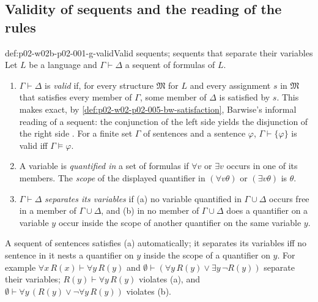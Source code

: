 \subsection{Validity of sequents and the reading of the rules}
\label{sec:p02-w02b-p02-001-g-setup}

\begin{hbdefinition}{def:p02-w02b-p02-001-g-valid}{Valid sequents; sequents that separate their variables}
Let \(L\) be a language and \(\Gamma\vdash\Delta\) a sequent of formulas of
\(L\).
\begin{enumerate}
\item \(\Gamma\vdash\Delta\) is \emph{valid} if, for every structure
      \(\mathfrak M\) for \(L\) and every assignment \(s\) in \(\mathfrak M\)
      that satisfies every member of \(\Gamma\), some member of \(\Delta\) is
      satisfied by \(s\).  This makes exact, by
      \cref{def:p02-w02-p02-005-bw-satisfaction}, Barwise's informal reading
      of a sequent: the conjunction of the left side yields the disjunction
      of the right side \cite[ch.~A.1, \S4, p.~37]{Barwise1977FirstOrder}.
      For a finite set \(\Gamma\) of sentences and a sentence \(\varphi\),
      \(\Gamma\vdash\{\varphi\}\) is valid iff \(\Gamma\models\varphi\).
\item A variable is \emph{quantified in} a set of formulas if
      \(\forall v\) or \(\exists v\) occurs in one of its members.  The
      \emph{scope} of the displayed quantifier in \((\forall v\theta)\) or
      \((\exists v\theta)\) is \(\theta\).
\item \(\Gamma\vdash\Delta\) \emph{separates its variables} if (a) no
      variable quantified in \(\Gamma\cup\Delta\) occurs free in a member of
      \(\Gamma\cup\Delta\), and (b) in no member of \(\Gamma\cup\Delta\) does
      a quantifier on a variable \(y\) occur inside the scope of another
      quantifier on the same variable \(y\).
\end{enumerate}
A sequent of sentences satisfies (a) automatically; it separates its
variables iff no sentence in it nests a quantifier on \(y\) inside the scope
of a quantifier on \(y\).  For example \(\forall x\,R(x)\vdash\forall y\,R(y)\)
and \(\emptyset\vdash(\forall y\,R(y)\lor\exists y\,\neg R(y))\) separate
their variables; \(R(y)\vdash\forall y\,R(y)\) violates (a), and
\(\emptyset\vdash\forall y\,(R(y)\lor\neg\forall y\,R(y))\) violates (b).
\end{hbdefinition}

